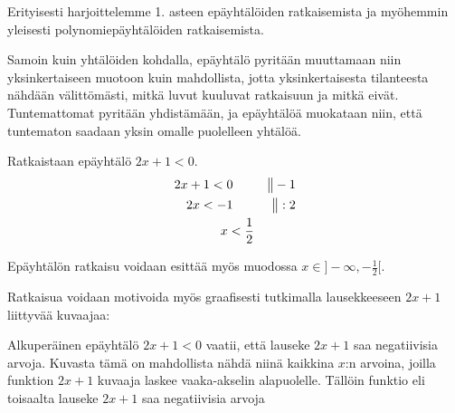Erityisesti harjoittelemme 1. asteen epäyhtälöiden ratkaisemista ja myöhemmin yleisesti polynomiepäyhtälöiden ratkaisemista.

Samoin kuin yhtälöiden kohdalla, epäyhtälö pyritään muuttamaan niin yksinkertaiseen muotoon kuin mahdollista, jotta yksinkertaisesta tilanteesta nähdään välittömästi, mitkä luvut kuuluvat ratkaisuun ja mitkä eivät. Tuntemattomat pyritään yhdistämään, ja epäyhtälöä muokataan niin, että tuntematon saadaan yksin omalle puolelleen yhtälöä.


\begin{esimerkki}
Ratkaistaan epäyhtälö $2x+1<0$.
\begin{align*}
2x+1<0 \ \ \ \ \ &&\big\| -1 \\
2x<-1 \ \ \ \ \ &&\big\| :2 \\
x<\-\frac{1}{2}
\end{align*}

Epäyhtälön ratkaisu voidaan esittää myös muodossa $x \in ]-\infty, -\frac{1}{2}[$.

Ratkaisua voidaan motivoida myös graafisesti tutkimalla lausekkeeseen $2x+1$ liittyvää kuvaajaa:

\begin{kuvaajapohja}{1}{-2}{2}{-2}{2}
\end{kuvaajapohja}



Alkuperäinen epäyhtälö $2x+1<0$ vaatii, että lauseke $2x+1$ saa negatiivisia arvoja. Kuvasta tämä on mahdollista nähdä niinä kaikkina $x$:n arvoina, joilla funktion $2x+1$ kuvaaja laskee vaaka-akselin alapuolelle. Tällöin funktio eli toisaalta lauseke $2x+1$ saa negatiivisia arvoja

\end{esimerkki}

